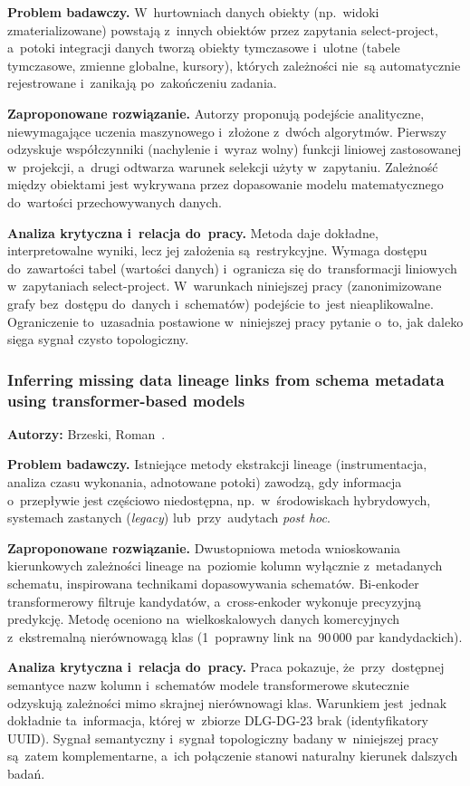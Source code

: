 \documentclass[polish,master,a4paper,oneside]{ppfcmthesis}
\renewcommand{\_}{\origtextunderscore\ifmmode\else\allowbreak\fi}
\begin{document}
\noindent\textbf{Problem badawczy.}
W~hurtowniach danych obiekty (np.~widoki zmaterializowane) powstają
z~innych obiektów przez zapytania select-project, a~potoki integracji danych
tworzą obiekty tymczasowe i~ulotne (tabele tymczasowe, zmienne globalne,
kursory), których zależności nie~są automatycznie rejestrowane i~zanikają
po~zakończeniu zadania.

\noindent\textbf{Zaproponowane rozwiązanie.}
Autorzy proponują podejście analityczne, niewymagające uczenia maszynowego
i~złożone z~dwóch algorytmów. Pierwszy odzyskuje współczynniki (nachylenie
i~wyraz wolny) funkcji liniowej zastosowanej w~projekcji, a~drugi odtwarza
warunek selekcji użyty w~zapytaniu. Zależność między obiektami jest wykrywana przez
dopasowanie modelu matematycznego do~wartości przechowywanych danych.

\noindent\textbf{Analiza krytyczna i~relacja do~pracy.}
Metoda daje dokładne, interpretowalne wyniki, lecz jej założenia
są~restrykcyjne. Wymaga dostępu do~zawartości tabel (wartości danych)
i~ogranicza się do~transformacji liniowych w~zapytaniach select-project.
W~warunkach niniejszej pracy (zanonimizowane grafy bez~dostępu do~danych
i~schematów) podejście to~jest nieaplikowalne. Ograniczenie to~uzasadnia
postawione w~niniejszej pracy pytanie o~to, jak daleko sięga sygnał czysto
topologiczny.

\subsubsection{Inferring missing data lineage links from schema metadata
using transformer-based models}
\noindent\textbf{Autorzy:} Brzeski, Roman~\cite{Brzeski2025}.

\noindent\textbf{Problem badawczy.}
Istniejące metody ekstrakcji lineage (instrumentacja, analiza czasu
wykonania, adnotowane potoki) zawodzą, gdy informacja o~przepływie jest
częściowo niedostępna, np.~w~środowiskach hybrydowych, systemach
zastanych (\emph{legacy}) lub~przy~audytach \emph{post hoc}.

\noindent\textbf{Zaproponowane rozwiązanie.}
Dwustopniowa metoda wnioskowania kierunkowych zależności lineage
na~poziomie kolumn wyłącznie z~metadanych schematu, inspirowana technikami
dopasowywania schematów. Bi-enkoder transformerowy filtruje kandydatów,
a~cross-enkoder wykonuje precyzyjną predykcję. Metodę oceniono
na~wielkoskalowych danych komercyjnych z~ekstremalną nierównowagą klas
(1~poprawny link na~90\,000 par kandydackich).

\noindent\textbf{Analiza krytyczna i~relacja do~pracy.}
Praca pokazuje, że~przy~dostępnej semantyce nazw kolumn i~schematów modele
transformerowe skutecznie odzyskują zależności mimo skrajnej nierównowagi
klas. Warunkiem jest~jednak dokładnie ta~informacja, której w~zbiorze
DLG-DG-23 brak (identyfikatory UUID). Sygnał semantyczny i~sygnał
topologiczny badany w~niniejszej pracy są~zatem komplementarne, a~ich
połączenie stanowi naturalny kierunek dalszych badań.
\end{document}
